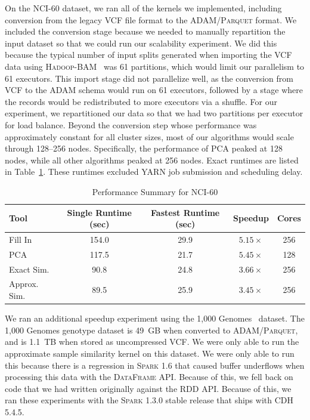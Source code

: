 \documentclass[11pt]{article} %
\begin{document}
On the NCI-60 dataset, we ran all of the kernels we implemented, including
conversion from the legacy \textsc{VCF} file format to the
\textsc{ADAM}/\textsc{Parquet} format. We included the conversion stage because
we needed to manually repartition the input dataset so that we could run our
scalability experiment. We did this because the typical number of input splits
generated when importing the \textsc{VCF} data using
\textsc{Hadoop-BAM}~\cite{niemenmaa12} was 61 partitions, which would limit
our parallelism to 61 executors. This import stage did not parallelize well,
as the conversion from \textsc{VCF} to the \textsc{ADAM} schema would run on
61 executors, followed by a stage where the records would be redistributed
to more executors via a shuffle. For our experiment, we repartitioned our data
so that we had two partitions per executor for load balance. Beyond the
conversion step whose performance was approximately constant for all cluster
sizes, most of our algorithms would scale through 128--256 nodes. Specifically,
the performance of PCA peaked at 128 nodes, while all other algorithms peaked
at 256 nodes. Exact runtimes are listed in Table~\ref{tab:nci-60}. These
runtimes excluded \textsc{YARN} job submission and scheduling delay.

\begin{table}[ht]
\centering
\caption{Performance Summary for NCI-60}
\label{tab:nci-60}
\begin{tabular}{ l | c c c | c }
\bf Tool & \bf Single Runtime (sec) & \bf Fastest Runtime (sec) & \bf Speedup & \bf Cores \\
\hline
\hline
Fill In & 154.0 & 29.9 & $5.15\times$ & 256 \\
PCA & 117.5 & 21.7 & $5.45\times$ & 128 \\
Exact Sim. & 90.8 & 24.8 & $3.66\times$ & 256 \\
Approx. Sim. & 89.5 & 25.9 & $3.45\times$ & 256 \\
\end{tabular}
\end{table}

We ran an additional speedup experiment using the 1,000 Genomes~\cite{1kg}
dataset. The 1,000 Genomes genotype dataset is 49~GB when converted to
\textsc{ADAM}/\textsc{Parquet}, and is 1.1~TB when stored as uncompressed
\textsc{VCF}. We were only able to run the approximate sample similarity kernel
on this dataset. We were only able to run this because there is a regression
in \textsc{Spark} 1.6 that caused buffer underflows when processing this data
with the \textsc{DataFrame} API. Because of this, we fell back on code that we
had written originally against the \textsc{RDD} API. Because of this, we ran
these experiments with the \textsc{Spark} 1.3.0 stable release that ships with
\textsc{CDH} 5.4.5.
\end{document}
